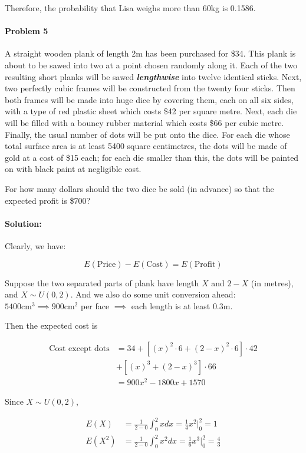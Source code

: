 \documentclass[a4paper, 11pt, twoside]{article}
\begin{document}
Therefore, the probability that Lisa weighs more than 60kg is 0.1586.

\paragraph{Problem 5} A straight wooden plank of length 2m has been purchased for \$34. This plank is about to be sawed into two at a point chosen randomly along it. Each of the two resulting short planks will be sawed \textbf{\textit{lengthwise}} into twelve identical sticks. Next, two perfectly cubic frames will be constructed from the twenty four sticks. Then both frames will be made into huge dice by covering them, each on all six sides, with a type of red plastic sheet which costs \$42 per square metre. Next, each die will be filled with a bouncy rubber material which costs \$66 per cubic metre. Finally, the usual number of dots will be put onto the dice. For each die whose total surface area is at least 5400 square centimetres, the dots will be made of gold at a cost of \$15 each; for each die smaller than this, the dots will be painted on with black paint at negligible cost.

For how many dollars should the two dice be sold (in advance) so that the expected profit is \$700?

\paragraph{Solution:} Clearly, we have:

\[E(\text{Price})-E(\text{Cost})=E(\text{Profit})\]

Suppose the two separated parts of plank have length $X$ and $2-X$ (in metres), and $X\sim U(0,2)$. And we also do some unit conversion ahead: $5400\text{cm}^3\implies 900\text{cm}^2$ per face $\implies$ each length is at least $0.3$m.

Then the expected cost is

\[
\begin{split}
	\text{Cost except dots}&=34+\left[\left(x\right)^2\cdot 6+\left(2-x\right)^2\cdot 6\right]\cdot 42\\
	&+\left[\left(x\right)^3+\left(2-x\right)^3\right]\cdot 66\\
	&=900x^2-1800x+1570
\end{split}
\]

Since $X\sim U(0,2)$,

\[\begin{split}
	E(X)&=\frac{1}{2-0}\int^2_0xdx = \frac{1}{4}x^2\bigg\rvert^2_0=1\\
	E(X^2)&=\frac{1}{2-0}\int^2_0x^2dx = \frac{1}{6}x^3\bigg\rvert^2_0=\frac{4}{3}
\end{split}
\]
\end{document}
